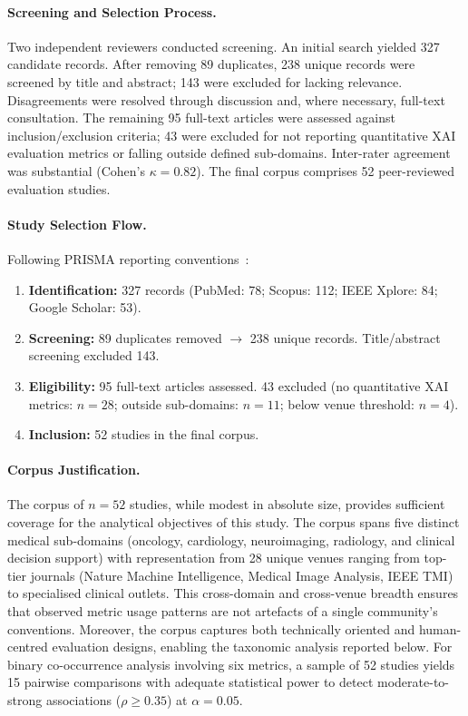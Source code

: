 \paragraph{Screening and Selection Process.}
Two independent reviewers conducted screening. An initial search yielded 327 candidate records. After removing 89 duplicates, 238 unique records were screened by title and abstract; 143 were excluded for lacking relevance. Disagreements were resolved through discussion and, where necessary, full-text consultation. The remaining 95 full-text articles were assessed against inclusion/exclusion criteria; 43 were excluded for not reporting quantitative XAI evaluation metrics or falling outside defined sub-domains. Inter-rater agreement was substantial (Cohen's $\kappa = 0.82$). The final corpus comprises 52 peer-reviewed evaluation studies.

\paragraph{Study Selection Flow.}
Following PRISMA reporting conventions~\cite{page2021prisma}:
\begin{enumerate}
    \item \textbf{Identification:} 327 records (PubMed: 78; Scopus: 112; IEEE Xplore: 84; Google Scholar: 53).
    \item \textbf{Screening:} 89 duplicates removed $\rightarrow$ 238 unique records. Title/abstract screening excluded 143.
    \item \textbf{Eligibility:} 95 full-text articles assessed. 43 excluded (no quantitative XAI metrics: $n=28$; outside sub-domains: $n=11$; below venue threshold: $n=4$).
    \item \textbf{Inclusion:} 52 studies in the final corpus.
\end{enumerate}

\paragraph{Corpus Justification.}
The corpus of $n = 52$ studies, while modest in absolute size, provides sufficient coverage for the analytical objectives of this study. The corpus spans five distinct medical sub-domains (oncology, cardiology, neuroimaging, radiology, and clinical decision support) with representation from 28 unique venues ranging from top-tier journals (Nature Machine Intelligence, Medical Image Analysis, IEEE TMI) to specialised clinical outlets. This cross-domain and cross-venue breadth ensures that observed metric usage patterns are not artefacts of a single community's conventions. Moreover, the corpus captures both technically oriented and human-centred evaluation designs, enabling the taxonomic analysis reported below. For binary co-occurrence analysis involving six metrics, a sample of 52 studies yields 15 pairwise comparisons with adequate statistical power to detect moderate-to-strong associations ($\rho \geq 0.35$) at $\alpha = 0.05$.

